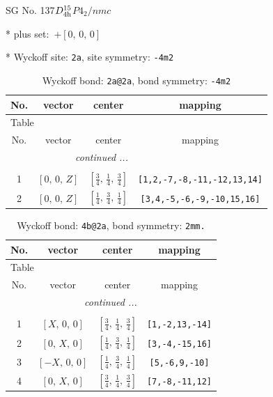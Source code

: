 \documentclass[fleqn,8pt]{jsarticle}
\begin{document}
\setcounter{MaxMatrixCols}{32}

\renewcommand{\tablename}{Table~}
\renewcommand{\figurename}{Figure~}
\begin{center}
\LARGE
SG No. 137\quad$D_{\rm 4h}^{15}$\quad$P4_2/nmc$\quad[ tetragonal ]
\end{center}

* plus set:\,\,\,$+\left[ 0,\, 0,\, 0 \right]$


* Wyckoff site: {\tt 2a}, site symmetry: {\tt -4m2}
\renewcommand{\arraystretch}{1.2}
\begin{longtable}{cccc}
\caption{Wyckoff bond: {\tt 2a@2a}, bond symmetry: {\tt -4m2}}
 \\
 \hline \hline
No. & vector & center & mapping \\ \hline \endfirsthead

\multicolumn{3}{l}{\tablename\ \thetable{}} \\
 \hline \hline
No. & vector & center & mapping \\ \hline \endhead

 \hline \hline
\multicolumn{3}{r}{\footnotesize\it continued ...} \\ \endfoot

 \hline \hline
\multicolumn{3}{r}{} \\ \endlastfoot

1 & $\left[ 0,\, 0,\, Z \right]$ & $\left[ \frac{3}{4},\, \frac{1}{4},\, \frac{3}{4} \right]$ & {\tt [1,2,-7,-8,-11,-12,13,14]} \\ \hline
2 & $\left[ 0,\, 0,\, Z \right]$ & $\left[ \frac{1}{4},\, \frac{3}{4},\, \frac{1}{4} \right]$ & {\tt [3,4,-5,-6,-9,-10,15,16]} \\
\end{longtable}
\renewcommand{\arraystretch}{1.2}
\begin{longtable}{cccc}
\caption{Wyckoff bond: {\tt 4b@2a}, bond symmetry: {\tt 2mm.}}
 \\
 \hline \hline
No. & vector & center & mapping \\ \hline \endfirsthead

\multicolumn{3}{l}{\tablename\ \thetable{}} \\
 \hline \hline
No. & vector & center & mapping \\ \hline \endhead

 \hline \hline
\multicolumn{3}{r}{\footnotesize\it continued ...} \\ \endfoot

 \hline \hline
\multicolumn{3}{r}{} \\ \endlastfoot

1 & $\left[ X,\, 0,\, 0 \right]$ & $\left[ \frac{3}{4},\, \frac{1}{4},\, \frac{3}{4} \right]$ & {\tt [1,-2,13,-14]} \\ \hline
2 & $\left[ 0,\, X,\, 0 \right]$ & $\left[ \frac{1}{4},\, \frac{3}{4},\, \frac{1}{4} \right]$ & {\tt [3,-4,-15,16]} \\ \hline
3 & $\left[ - X,\, 0,\, 0 \right]$ & $\left[ \frac{1}{4},\, \frac{3}{4},\, \frac{1}{4} \right]$ & {\tt [5,-6,9,-10]} \\ \hline
4 & $\left[ 0,\, X,\, 0 \right]$ & $\left[ \frac{3}{4},\, \frac{1}{4},\, \frac{3}{4} \right]$ & {\tt [7,-8,-11,12]} \\
\end{longtable}
\end{document}
